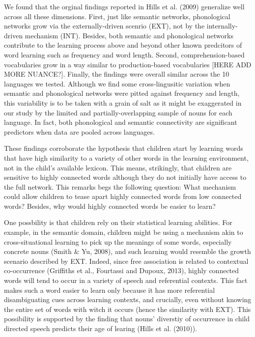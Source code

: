 \documentclass[english,floatsintext,man]{apa6}
\theoremstyle{definition}
\theoremstyle{definition}
\theoremstyle{definition}
\theoremstyle{remark}
\begin{document}
We found that the orginal findings reported in Hills et al. (2009)
generalize well across all these dimensions. First, just like semantic
networks, phonological networks grow via the externally-driven scenrio
(EXT), not by the internally-driven mechanism (INT). Besides, both
semantic and phonological networks contribute to the learning process
above and beyond other known predcitors of word learning such as
frequency and word length. Second, comprehension-based vocabularies grow
in a way similar to production-based vocabularies {[}HERE ADD MORE
NUANCE?{]}. Finally, the findings were overall similar across the 10
languages we tested. Although we find some cross-lingusitic variation
when semantic and phonological networks were pitted against frequency
and length, this variability is to be taken with a grain of salt as it
might be exaggerated in our study by the limited and
partially-overlapping sample of nouns for each language. In fact, both
phonological and semantic connectivity are significant predictors when
data are pooled across languages.

These findings corroborate the hypothesis that children start by
learning words that have high similarity to a variety of other words in
the learning environment, not in the child's available lexicon. This
means, strikingly, that children are sensitive to highly connected words
although they do not initially have access to the full network. This
remarks begs the following question: What mechanism could allow children
to tease apart highly connected words from low connected words? Besides,
why would highly connected words be easier to learn?

One possbility is that children rely on their statistical learning
abilities. For example, in the semantic domain, children might be using
a mechanism akin to cross-situational learning to pick up the meanings
of some words, especially concrete nouns (Smith \& Yu, 2008), and such
learning would resemble the growth scenario described by EXT. Indeed,
since free association is related to contextual co-occurrence (Griffiths
et al., Fourtassi and Dupoux, 2013), highly connected words will tend to
occur in a variety of speech and referential contexts. This fact makes
such a word easier to learn only because it has more referential
disambiguating cues across learning contexts, and crucially, even
without knowing the entire set of words with witch it occurs (hence the
similarity with EXT). This possibility is supported by the finding that
nouns' diverstiy of occurrence in child directed speech predicts their
age of learing (Hills et al. (2010)).
\end{document}

